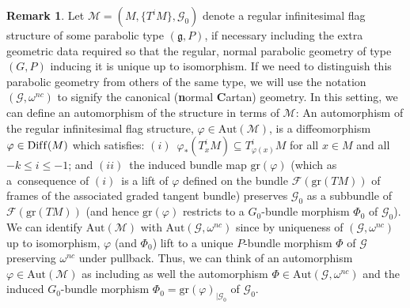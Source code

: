 \documentclass[11pt]{article}
\def\g{\mathfrak{g}}
\def\Gbdle{\mathcal{G}}
\theoremstyle{plain}
\theoremstyle{definition}
\newtheorem{Remark}[Definition]{Remark}
\begin{document}
\begin{Remark} \label{underlying automorphisms} Let $\mathcal{M} = (M,\{T^iM\},\Gbdle_0)$ denote a regular inf\/initesimal f\/lag structure of some parabolic type $(\g,P)$, if necessary including the extra geometric data required so that the regular, normal parabolic geometry of type $(G,P)$ inducing it is unique up to isomorphism. If we need to distinguish this parabolic geometry from others of the same type, we will use the notation $(\Gbdle,\omega^{nc})$ to signify the canonical (\textbf{n}ormal \textbf{C}artan) geometry. In this setting, we can def\/ine an automorphism of the structure in terms of $\mathcal{M}$: An automorphism of the regular inf\/initesimal f\/lag structure, $\varphi \in \mathrm{Aut}(\mathcal{M})$, is a dif\/feomorphism $\varphi \in \mathrm{Dif\/f}(M)$ which satisf\/ies: $(i)$~$\varphi_*(T_x^iM) \subseteq T_{\varphi(x)}^iM$ for all $x \in M$ and all $-k \leq i \leq -1$; and $(ii)$~the induced bundle map $\mathrm{gr}(\varphi)$ (which as a~consequence of $(i)$~is a lift of $\varphi$ def\/ined on the bundle $\mathcal{F}(\mathrm{gr}(TM))$ of frames of the associated graded tangent bundle) preserves $\Gbdle_0$ as a subbundle of $\mathcal{F}(\mathrm{gr}(TM))$ (and hence $\mathrm{gr}(\varphi)$ restricts to a $G_0$-bundle morphism $\Phi_0$ of $\Gbdle_0$). We can identify $\mathrm{Aut}(\mathcal{M})$ with $\mathrm{Aut}(\Gbdle,\omega^{nc})$ since by uniqueness of $(\Gbdle,\omega^{nc})$ up to isomorphism, $\varphi$ (and $\Phi_0$) lift to a unique $P$-bundle morphism $\Phi$ of $\Gbdle$ preserving $\omega^{nc}$ under pullback. Thus, we can think of an automorphism $\varphi \in \mathrm{Aut}(\mathcal{M})$ as including as well the automorphism $\Phi \in \mathrm{Aut}(\Gbdle,\omega^{nc})$ and the induced $G_0$-bundle morphism $\Phi_0 = \mathrm{gr}(\varphi)_{\vert \Gbdle_0}$ of $\Gbdle_0$.
\end{Remark}
\end{document}
